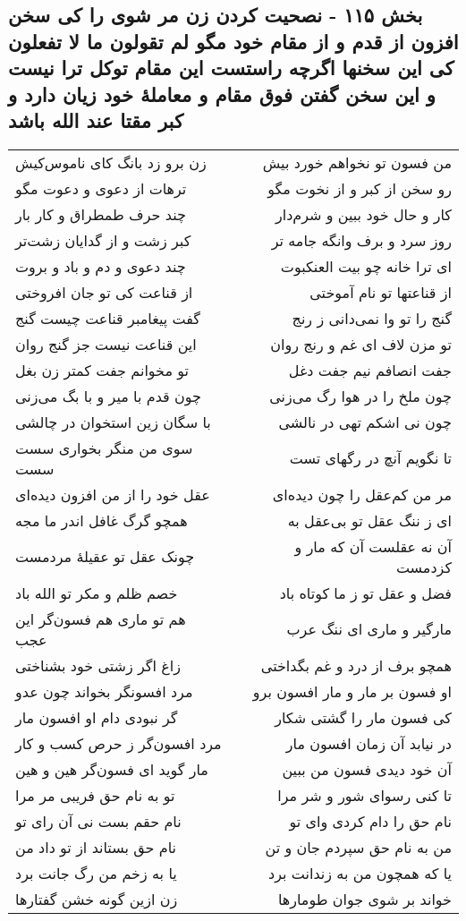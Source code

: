 \begin{center}
\section*{بخش ۱۱۵ - نصحیت کردن زن مر شوی را کی سخن افزون از قدم و از مقام خود مگو لم تقولون ما لا تفعلون کی این سخنها اگرچه راستست این مقام توکل ترا نیست و این سخن گفتن فوق مقام و معاملهٔ خود زیان دارد و کبر مقتا عند الله باشد}
\label{sec:sh115}
\begin{longtable}{l p{0.5cm} r}
زن برو زد بانگ کای ناموس‌کیش
&&
من فسون تو نخواهم خورد بیش
\\
ترهات از دعوی و دعوت مگو
&&
رو سخن از کبر و از نخوت مگو
\\
چند حرف طمطراق و کار بار
&&
کار و حال خود ببین و شرم‌دار
\\
کبر زشت و از گدایان زشت‌تر
&&
روز سرد و برف وانگه جامه تر
\\
چند دعوی و دم و باد و بروت
&&
ای ترا خانه چو بیت العنکبوت
\\
از قناعت کی تو جان افروختی
&&
از قناعتها تو نام آموختی
\\
گفت پیغامبر قناعت چیست گنج
&&
گنج را تو وا نمی‌دانی ز رنج
\\
این قناعت نیست جز گنج روان
&&
تو مزن لاف ای غم و رنج روان
\\
تو مخوانم جفت کمتر زن بغل
&&
جفت انصافم نیم جفت دغل
\\
چون قدم با میر و با بگ می‌زنی
&&
چون ملخ را در هوا رگ می‌زنی
\\
با سگان زین استخوان در چالشی
&&
چون نی اشکم تهی در نالشی
\\
سوی من منگر بخواری سست سست
&&
تا نگویم آنچ در رگهای تست
\\
عقل خود را از من افزون دیده‌ای
&&
مر من کم‌عقل را چون دیده‌ای
\\
همچو گرگ غافل اندر ما مجه
&&
ای ز ننگ عقل تو بی‌عقل به
\\
چونک عقل تو عقیلهٔ مردمست
&&
آن نه عقلست آن که مار و کزدمست
\\
خصم ظلم و مکر تو الله باد
&&
فضل و عقل تو ز ما کوتاه باد
\\
هم تو ماری هم فسون‌گر این عجب
&&
مارگیر و ماری ای ننگ عرب
\\
زاغ اگر زشتی خود بشناختی
&&
همچو برف از درد و غم بگداختی
\\
مرد افسونگر بخواند چون عدو
&&
او فسون بر مار و مار افسون برو
\\
گر نبودی دام او افسون مار
&&
کی فسون مار را گشتی شکار
\\
مرد افسون‌گر ز حرص کسب و کار
&&
در نیابد آن زمان افسون مار
\\
مار گوید ای فسون‌گر هین و هین
&&
آن خود دیدی فسون من ببین
\\
تو به نام حق فریبی مر مرا
&&
تا کنی رسوای شور و شر مرا
\\
نام حقم بست نی آن رای تو
&&
نام حق را دام کردی وای تو
\\
نام حق بستاند از تو داد من
&&
من به نام حق سپردم جان و تن
\\
یا به زخم من رگ جانت برد
&&
یا که همچون من به زندانت برد
\\
زن ازین گونه خشن گفتارها
&&
خواند بر شوی جوان طومارها
\\
\end{longtable}
\end{center}
